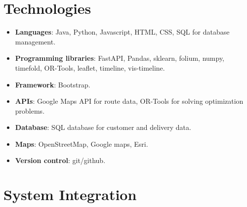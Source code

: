 \documentclass[a4paper,12pt, final]{article}
\begin{document}
\section{Technologies}
\begin{itemize}
    \item \textbf{Languages}: Java, Python, Javascript, HTML, CSS, SQL for database management.
    \item \textbf{Programming libraries}:  FastAPI, Pandas, sklearn, folium, numpy, timefold, OR-Tools, leaflet, timeline, vis-timeline.
    \item \textbf{Framework}: Bootstrap. 
    \item \textbf{APIs}: Google Maps API for route data, OR-Tools for solving optimization problems.
    \item \textbf{Database}: SQL database for customer and delivery data.
    \item \textbf{Maps}: OpenStreetMap, Google maps, Esri.
    \item \textbf{Version control}: git/github.
\end{itemize}

\section{System Integration}
\end{document}
